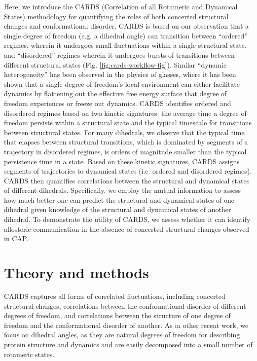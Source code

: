 \documentclass[../main.tex]{subfiles}
\begin{document}
    Here, we introduce the CARDS (Correlation of all Rotameric and Dynamical States) methodology for quantifying the roles of both concerted structural changes and conformational disorder. CARDS is based on our observation that a single degree of freedom (e.g. a dihedral angle) can transition between “ordered” regimes, wherein it undergoes small fluctuations within a single structural state, and “disordered” regimes wherein it undergoes bursts of transitions between different structural states (Fig. \ref{fig:cards-workflow-fig}). Similar “dynamic heterogeneity”\cite{Ediger:2000ed,Glotzer:2000fy,Richert:2002fa} has been observed in the physics of glasses, where it has been shown that a single degree of freedom’s local environment can either facilitate dynamics by flattening out the effective free energy surface that degree of freedom experiences or freeze out dynamics\cite{Merolle:2005kx,Hedges:2007fw,Keys:2011ut}. CARDS identifies ordered and disordered regimes based on two kinetic signatures: the average time a degree of freedom persists within a structural state and the typical timescale for transitions between structural states. For many dihedrals, we observe that the typical time that elapses between structural transitions, which is dominated by segments of a trajectory in disordered regimes, is orders of magnitude smaller than the typical persistence time in a state. Based on these kinetic signatures, CARDS assigns segments of trajectories to dynamical states (i.e. ordered and disordered regimes). CARDS then quantifies correlations between the structural and dynamical states of different dihedrals. Specifically, we employ the mutual information to assess how much better one can predict the structural and dynamical states of one dihedral given knowledge of the structural and dynamical states of another dihedral. To demonstrate the utility of CARDS, we assess whether it can identify allosteric communication in the absence of concerted structural changes observed in CAP.


    \section{Theory and methods}
    CARDS captures all forms of correlated fluctuations, including concerted structural changes, correlations between the conformational disorder of different degrees of freedom, and correlations between the structure of one degree of freedom and the conformational disorder of another. As in other recent work, we focus on dihedral angles, as they are natural degrees of freedom for describing protein structure and dynamics and are easily decomposed into a small number of rotameric states\cite{McClendon:2009gd,Dubay:2011ey}.
\end{document}
